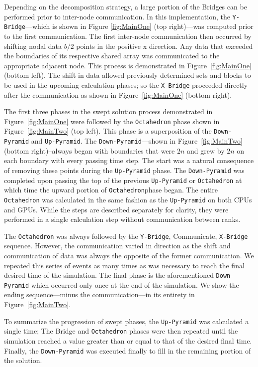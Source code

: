 \documentclass[journal,article,submit,moreauthors,pdftex]{Definitions/mdpi}
\def\Up{\texttt{Up-Pyramid}}
\def\Down{\texttt{Down-Pyramid}}
\def\Oct{\texttt{Octahedron}}
\def\Xb{\texttt{X-Bridge}}
\def\Yb{\texttt{Y-Bridge}}
\begin{document}
\begin{paracol}{2}
\linenumbers
\switchcolumn

\par
Depending on the decomposition strategy, a large portion of the Bridges can be performed prior to inter-node communication. In this implementation, the \Yb{}---which is shown in Figure \ref{fig:MainOne} (top right)---was computed prior to the first communication. The first inter-node communication then occurred by shifting nodal data $b/2$ points in the positive x direction. Any data that exceeded the boundaries of its respective shared array was communicated to the appropriate adjacent node. This process is demonstrated in Figure~\ref{fig:MainOne} (bottom left). The shift in data allowed previously determined sets and blocks to be used in the upcoming calculation phases; so the \Xb{} proceeded directly after the communication as shown in Figure~\ref{fig:MainOne} (bottom right).

% 

\par
The first three phases in the swept solution process demonstrated in Figure~\ref{fig:MainOne} were followed by the \Oct{} phase shown in Figure~\ref{fig:MainTwo} (top left). This phase is a superposition of the \Down{} and \Up{}. The \Down{}---shown in Figure~\ref{fig:MainTwo} (bottom right)--always began with boundaries that were $2n$ and grew by $2n$ on each boundary with every passing time step. The start was a natural consequence of removing these points during the \Up{} phase. The \Down{} was completed upon passing the top of the previous \Up{} or \Oct{} at which time the upward portion of \Oct phase began. The entire \Oct{} was calculated in the same fashion as the \Up{} on both CPUs and GPUs. While the steps are described separately for clarity, they were performed in a single calculation step without communication between ranks. 

\par
The \Oct{} was always followed by the \Yb{}, Communicate, \Xb{} sequence. However, the communication varied in direction as the shift and communication of data was always the opposite of the former communication. We repeated this series of events as many times as was necessary to reach the final desired time of the simulation. The final phase is the aforementioned \Down{} which occurred only once at the end of the simulation. We show the ending sequence---minus the communication---in its entirety in Figure~\ref{fig:MainTwo}. 
\par
To summarize the progression of swept phases, the \Up{} was calculated a single time; The Bridge and \Oct{} phases were then repeated until the simulation reached a value greater than or equal to that of the desired final time. Finally, the \Down{} was executed finally to fill in the remaining portion of the solution.

\end{paracol}
\end{document}
